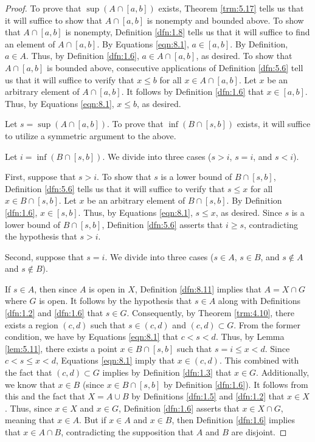 \documentclass[../main.tex]{subfiles}
\begin{document}
\begin{theorem}
\begin{proof}
        To prove that $\sup(A\cap[a,b])$ exists, Theorem \ref{trm:5.17} tells us that it will suffice to show that $A\cap[a,b]$ is nonempty and bounded above. To show that $A\cap[a,b]$ is nonempty, Definition \ref{dfn:1.8} tells us that it will suffice to find an element of $A\cap[a,b]$. By Equations \ref{eqn:8.1}, $a\in[a,b]$. By Definition, $a\in A$. Thus, by Definition \ref{dfn:1.6}, $a\in A\cap[a,b]$, as desired. To show that $A\cap[a,b]$ is bounded above, consecutive applications of Definition \ref{dfn:5.6} tell us that it will suffice to verify that $x\leq b$ for all $x\in A\cap[a,b]$. Let $x$ be an arbitrary element of $A\cap[a,b]$. It follows by Definition \ref{dfn:1.6} that $x\in[a,b]$. Thus, by Equations \ref{eqn:8.1}, $x\leq b$, as desired.\par\smallskip
        Let $s=\sup(A\cap[a,b])$. To prove that $\inf(B\cap[s,b])$ exists, it will suffice to utilize a symmetric argument to the above.\par\smallskip
        Let $i=\inf(B\cap[s,b])$. We divide into three cases ($s>i$, $s=i$, and $s<i$).\par\smallskip
        First, suppose that $s>i$. To show that $s$ is a lower bound of $B\cap[s,b]$, Definition \ref{dfn:5.6} tells us that it will suffice to verify that $s\leq x$ for all $x\in B\cap[s,b]$. Let $x$ be an arbitrary element of $B\cap[s,b]$. By Definition \ref{dfn:1.6}, $x\in[s,b]$. Thus, by Equations \ref{eqn:8.1}, $s\leq x$, as desired. Since $s$ is a lower bound of $B\cap[s,b]$, Definition \ref{dfn:5.6} asserts that $i\geq s$, contradicting the hypothesis that $s>i$.\par\smallskip
        Second, suppose that $s=i$. We divide into three cases ($s\in A$, $s\in B$, and $s\notin A$ and $s\notin B$).\par
        If $s\in A$, then since $A$ is open in $X$, Definition \ref{dfn:8.11} implies that $A=X\cap G$ where $G$ is open. It follows by the hypothesis that $s\in A$ along with Definitions \ref{dfn:1.2} and \ref{dfn:1.6} that $s\in G$. Consequently, by Theorem \ref{trm:4.10}, there exists a region $(c,d)$ such that $s\in(c,d)$ and $(c,d)\subset G$. From the former condition, we have by Equations \ref{eqn:8.1} that $c<s<d$. Thus, by Lemma \ref{lem:5.11}, there exists a point $x\in B\cap[s,b]$ such that $s=i\leq x<d$. Since $c<s\leq x<d$, Equations \ref{eqn:8.1} imply that $x\in(c,d)$. This combined with the fact that $(c,d)\subset G$ implies by Definition \ref{dfn:1.3} that $x\in G$. Additionally, we know that $x\in B$ (since $x\in B\cap[s,b]$ by Definition \ref{dfn:1.6}). It follows from this and the fact that $X=A\cup B$ by Definitions \ref{dfn:1.5} and \ref{dfn:1.2} that $x\in X$. Thus, since $x\in X$ and $x\in G$, Definition \ref{dfn:1.6} asserts that $x\in X\cap G$, meaning that $x\in A$. But if $x\in A$ and $x\in B$, then Definition \ref{dfn:1.6} implies that $x\in A\cap B$, contradicting the supposition that $A$ and $B$ are disjoint.\par

\end{proof}
\end{theorem}
\end{document}
